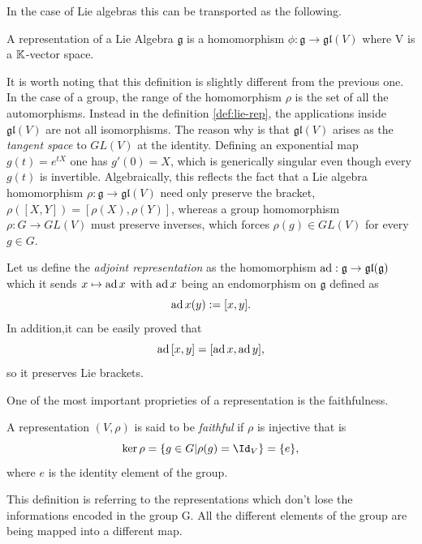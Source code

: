 In the case of Lie algebras this can be transported as the following.

\begin{definition}\label{def:lie-rep}
	A representation of a Lie Algebra $\mathfrak{g}$ is a homomorphism $\phi: \mathfrak{g} \to \mathfrak{gl}(V)$ where V is a $\mathbb{K}$-vector space.
\end{definition}

\begin{remark}
	It is worth noting that this definition is slightly different from the previous one. In the case of a group, the range of the homomorphism $\rho$ is the set of all the automorphisms. Instead in the definition \ref{def:lie-rep}, the applications inside $\mathfrak{gl}(V)$ are not all isomorphisms. The reason why is that $\mathfrak{gl}(V)$ arises as the \emph{tangent space} to $GL(V)$ at the identity.  Defining an exponential map $g(t) = e^{tX}$ one has $g'(0) = X$, which is generically singular even though every $g(t)$ is invertible. Algebraically, this reflects the fact that a Lie algebra homomorphism $\rho : \mathfrak{g} \to \mathfrak{gl}(V)$ need only preserve the bracket, $\rho([X,Y]) = [\rho(X),\rho(Y)]$, whereas a group homomorphism $\rho : G \to GL(V)$ must preserve inverses, which forces $\rho(g) \in GL(V)$ for every $g \in G$.
\end{remark}

\begin{example}
	Let us define the \textit{adjoint representation} as the homomorphism $\operatorname{ad}: \mathfrak{g} \to \mathfrak{gl}(\mathfrak{g})$ which it sends $x \mapsto \operatorname{ad}{x}$ with $\operatorname{ad}{x}$ being an endomorphism on $\mathfrak{g}$ defined as \[ \operatorname{ad}{x}(y) := [x,y].\]
	In addition,it can be easily proved that \[
		\operatorname{ad}{[x,y]} = [\operatorname{ad}{x},\operatorname{ad}{y}],
	\]
	so it preserves Lie brackets.
\end{example}

One of the most important proprieties of a representation is the faithfulness.
\begin{definition}\label{def:rep-faith}
	A representation $(V, \rho)$ is said to be \textit{faithful} if $\rho$ is injective that is
	\[
		\ker{\rho} = \{g \in G | \rho(g) = \Id_V\} = \{e\},
	\]
	where $e$ is the identity element of the group.
\end{definition}

\begin{remark}
	This definition is referring to the representations which don't lose the informations encoded in the group G. All the different elements of the group are being mapped into a different map.
\end{remark}

